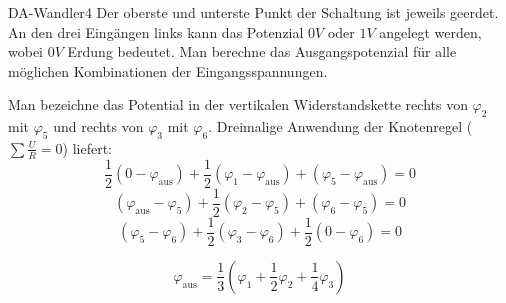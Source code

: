 \begin{problem}{DA-Wandler}{4}
Der oberste und unterste Punkt der Schaltung ist jeweils geerdet. An den drei Eingängen links kann das Potenzial $0\unit{V}$ oder $1\unit{V}$ angelegt werden, wobei $0\unit{V}$ Erdung bedeutet. Man berechne das Ausgangspotenzial für alle möglichen Kombinationen der Eingangsspannungen.

\begin{solution}
Man bezeichne das Potential in der vertikalen Widerstandskette rechts von $\varphi_2$ mit $\varphi_5$ und rechts von $\varphi_3$ mit $\varphi_6$. Dreimalige Anwendung der Knotenregel ($\sum\frac U R = 0$) liefert:
\[
 \frac 1 2 (0-\varphi_{\mathrm{aus}}) + \frac 1 2 (\varphi_1-\varphi_{\mathrm{aus}}) + (\varphi_5-\varphi_{\mathrm{aus}}) = 0
\]
\[
 (\varphi_{\mathrm{aus}}-\varphi_5) + \frac 1 2 (\varphi_2-\varphi_5) + (\varphi_6-\varphi_5) = 0
\]
\[
 (\varphi_5-\varphi_6) + \frac 1 2 (\varphi_3-\varphi_6) + \frac 1 2 (0-\varphi_6) = 0
\]

\[
 \varphi_{\mathrm{aus}} = \frac 1 3 \left(\varphi_1+\frac 1 2 \varphi_2+\frac 1 4 \varphi_3\right)
\]
\end{solution}
\end{problem}


